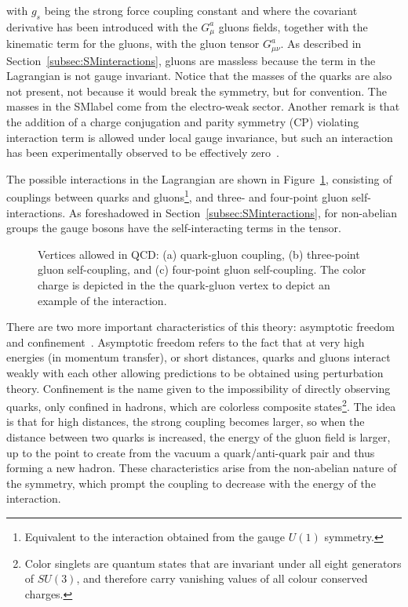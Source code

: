 with $g_s$ being the strong force coupling constant and where the covariant derivative has been introduced
with the $G_\mu^a$ gluons fields, together with the kinematic term for the gluons, with the gluon tensor $G_{\mu\nu}^a$.
As described in Section~\ref{subsec:SMinteractions}, gluons are massless because the term in the Lagrangian is not gauge invariant.
Notice that the masses of the quarks are also not present, not because it would break the symmetry, but for convention.
The masses in the \acrshort{SMlabel} come from the electro-weak sector.
Another remark is that the addition of a charge conjugation and parity symmetry (CP)
violating interaction term is allowed under local gauge invariance, but such an interaction has been experimentally observed
to be effectively zero~\cite{PhysRevLett.124.081803}.

 The possible interactions in the Lagrangian are shown in Figure~\ref{figSM:QCDfey}, consisting of couplings between quarks and gluons\footnote{Equivalent to the interaction obtained from the gauge $U(1)$ symmetry.}, and three- and four-point gluon self-interactions. As foreshadowed in Section~\ref{subsec:SMinteractions}, for non-abelian groups the gauge bosons have the self-interacting terms in the tensor.

\begin{figure}[htbp]
    \RawFloats
    \begin{center}
    \quad
    \quad
    \caption{Vertices allowed in QCD: (a) quark-gluon coupling, (b) three-point gluon self-coupling, and (c) four-point gluon self-coupling. The color charge is depicted in the the quark-gluon vertex to depict an example of the interaction.}
    \label{figSM:QCDfey}
    \end{center}
\end{figure}

There are two more important characteristics of this theory:
asymptotic freedom and confinement~\cite{PhysRevLett.30.1346,PhysRevLett.30.1343}. Asymptotic freedom refers to the fact that at very high energies (in momentum transfer), or short distances, quarks and gluons interact weakly with each other allowing predictions to be obtained using perturbation theory. Confinement is the name given to the impossibility of directly observing quarks, only confined in hadrons, which are colorless composite states\footnote{Color singlets are quantum states that are invariant under all eight generators of $SU(3)$, and therefore carry vanishing values of all colour conserved charges.}.
The idea is that for high distances, the strong coupling becomes larger, so when the distance between two quarks is increased, the energy of the gluon field is larger, up to the point to create from the vacuum a quark/anti-quark pair and thus forming a new hadron. These characteristics arise from the non-abelian nature of the symmetry, which prompt the coupling to decrease with the energy of the interaction.

